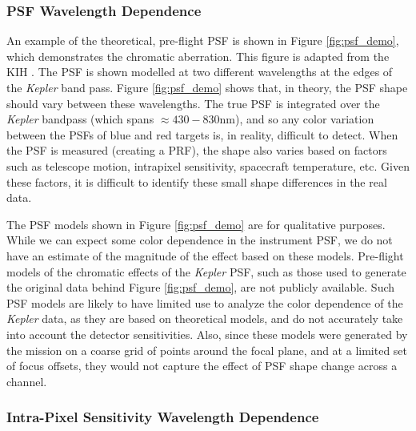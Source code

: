 \documentclass[iop]{emulateapj}
\newcommand{\kepler}{\emph{Kepler}\xspace}
\begin{document}
\subsubsection{PSF Wavelength Dependence}
An example of the theoretical, pre-flight PSF is shown in Figure \ref{fig:psf_demo}, which demonstrates the chromatic aberration. This figure is adapted from the KIH \citep{kih}. The PSF is shown modelled at two different wavelengths at the edges of the \kepler band pass. Figure \ref{fig:psf_demo} shows that, in theory, the PSF shape should vary between these wavelengths. The true PSF is integrated over the \kepler bandpass (which spans $\approx 430 - 830$nm), and so any color variation between the PSFs of blue and red targets is, in reality, difficult to detect. When the PSF is measured (creating a PRF), the shape also varies based on factors such as telescope motion, intrapixel sensitivity, spacecraft temperature, etc. Given these factors, it is difficult to identify these small shape differences in the real data.

The PSF models shown in Figure \ref{fig:psf_demo} are for qualitative purposes. While we can expect some color dependence in the instrument PSF, we do not have an estimate of the magnitude of the effect based on these models. Pre-flight models of the chromatic effects of the \kepler PSF, such as those used to generate the original data behind Figure \ref{fig:psf_demo}, are not publicly available. Such PSF models are likely to have limited use to analyze the color dependence of the \kepler data, as they are based on theoretical models, and do not accurately take into account the detector sensitivities. Also, since these models were generated by the mission on a coarse grid of points around the focal plane, and at a limited set of focus offsets, they would not capture the effect of PSF shape change across a channel.

\subsubsection{Intra-Pixel Sensitivity Wavelength Dependence}
\end{document}
